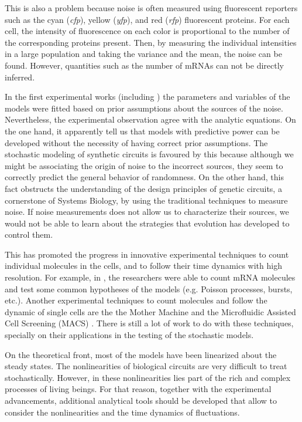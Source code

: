 This is also a problem because noise is often measured using fluorescent reporters such as the cyan (\textit{cfp}), yellow (\textit{yfp}), and red (\textit{rfp}) fluorescent proteins. For each cell, the intensity of fluorescence on each color is proportional to the number of the corresponding proteins present. Then, by measuring the individual intensities in a large population and taking the variance and the mean, the noise can be found. However, quantities such as the number of mRNAs can not be directly inferred.

In the first experimental works (including \cite{pedraza05}) the parameters and variables of the models were fitted based on prior assumptions about the sources of the noise. Nevertheless, the experimental observation agree with the analytic equations. On the one hand, it apparently tell us that models with predictive power can be developed without the necessity of having correct prior assumptions. The stochastic modeling of synthetic circuits is favoured by this because although we might be associating the origin of noise to the incorrect sources, they seem to correctly predict the general behavior of randomness. On the other hand, this fact obstructs the understanding of the design principles of genetic circuits, a cornerstone of Systems Biology, by using the traditional techniques to measure noise. If noise measurements does not allow us to characterize their sources, we would not be able to learn about the strategies that evolution has developed to control them.

This has promoted the progress in innovative experimental techniques to count individual molecules in the cells, and to follow their time dynamics with high resolution. For example, in \cite{golding05}, the researchers were able to count mRNA molecules and test some common hypotheses of the models (e.g. Poisson processes, bursts, etc.). Another experimental techniques to count molecules and follow the dynamic of single cells are the the Mother Machine \cite{wang10} and the Microfluidic Assisted Cell Screening (MACS) \cite{okumus13}. There is still a lot of work to do with these techniques, specially on their applications in the testing of the stochastic models.

On the theoretical front, most of the models have been linearized about the steady states. The nonlinearities of biological circuits are very difficult to treat stochastically. However, in these nonlinearities lies part of the rich and complex processes of living beings. For that reason, together with the experimental advancements, additional analytical tools should be developed that allow to consider the nonlinearities and the time dynamics of fluctuations.

